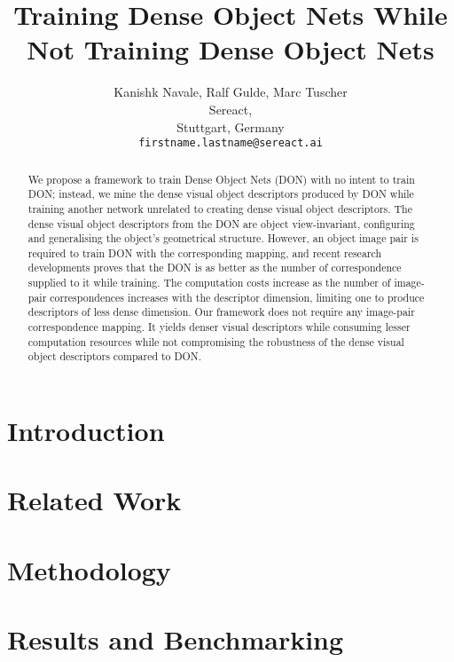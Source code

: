 \documentclass[english]{article}
\title{Training Dense Object Nets While Not Training Dense Object Nets}
\author{ {Kanishk Navale, Ralf Gulde, Marc Tuscher} \\
	Sereact, \\
	Stuttgart, Germany \\
	\texttt{firstname.lastname@sereact.ai} \\
}
\begin{document}
\maketitle

\begin{abstract}
	We propose a framework to train Dense Object Nets (DON) with no intent to train DON;
	instead, we mine the dense visual object descriptors produced by DON while training another
	network unrelated to creating dense visual object descriptors. The dense visual object descriptors
	from the DON are object view-invariant, configuring and generalising the object's
	geometrical structure. However, an object image pair is required to train DON with the
	corresponding mapping, and recent research developments proves that the DON is as better as the number
	of correspondence supplied to it while training. The computation costs increase as the number
	of image-pair correspondences increases with the descriptor dimension, limiting one to produce
	descriptors of less dense dimension. Our framework does not require any image-pair correspondence mapping.
	It yields denser visual descriptors while consuming lesser computation resources while not compromising
	the robustness of the dense visual object descriptors compared to DON.

\end{abstract}



\section{Introduction}


\section{Related Work}


\section{Methodology}


\section{Results and Benchmarking}



\printbibliography
\end{document}
